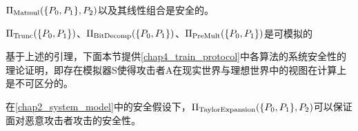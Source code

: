 \begin{lemma} \label{ss_matmul}
	$\Pi_{\rm Matmul}(\{P_0, P_1\}, P_2)$以及其线性组合是安全的\cite{Threshold_ECDSA, beaver_efficient}。
\end{lemma}

\begin{lemma} \label{ss_trunc_Bit_premult}
	$\Pi_{\rm Trunc}(\{P_0, P_1\})$、$\Pi_{\rm BitDecomp}(\{P_0, P_1\})$、$\Pi_{\rm PreMult}(\{P_0, P_1\})$是可模拟的\cite{fix_point_mpc}
\end{lemma}

基于上述的引理，下面本节提供\ref{chap4_train_protocol}中各算法的系统安全性的理论证明，即存在模拟器S使得攻击者A在现实世界与理想世界中的视图在计算上是不可区分的。

\begin{theorem}
	\label{TayRxp_theorem}
	在\ref{chap2_system_model}中的安全假设下，$\Pi_{\rm TaylorExpansion}(\{P_0, P_1\}, P_2)$可以保证面对恶意攻击者攻击的安全性。
\end{theorem}

